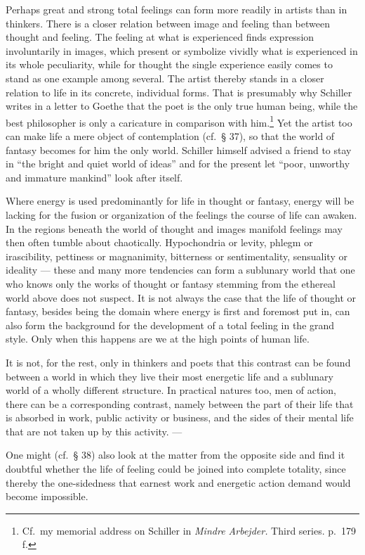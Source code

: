\documentclass[12pt]{book}
\newcommand{\opage}[1]{\marginnote{\footnotesize\textit{[#1]}}}
\begin{document}
Perhaps great and strong total feelings can form more readily in artists than in thinkers. There
is a closer relation between image and feeling than between thought and feeling. The feeling at
what is experienced finds expression involuntarily in images, which present or symbolize vividly
what is experienced in its whole peculiarity, while for thought the single experience easily comes
to stand as one example among several. The artist thereby stands in a closer relation to life in
its concrete, individual forms. That is presumably why Schiller writes in a letter to Goethe that
the poet is the only true human being, while the best philosopher is only a caricature in
\opage{169}comparison with him.\footnote{Cf.\ my memorial address on Schiller in \textit{Mindre
Arbejder.} Third series. p.~179 f.} Yet the artist too can make life a mere object of
contemplation (cf.\ § 37), so that the world of fantasy becomes for him the only world. Schiller
himself advised a friend to stay in ``the bright and quiet world of ideas'' and for the present let
``poor, unworthy and immature mankind'' look after itself.

Where energy is used predominantly for life in thought or fantasy, energy will be lacking for the
fusion or organization of the feelings the course of life can awaken. In the regions beneath the
world of thought and images manifold feelings may then often tumble about chaotically.
Hypochondria or levity, phlegm or irascibility, pettiness or magnanimity, bitterness or
sentimentality, sensuality or ideality --- these and many more tendencies can form a sublunary world
that one who knows only the works of thought or fantasy stemming from the ethereal world above does
not suspect. It is not always the case that the life of thought or fantasy, besides being the domain
where energy is first and foremost put in, can also form the background for the development of a
total feeling in the grand style. Only when this happens are we at the high points of human life.

It is not, for the rest, only in thinkers and poets that this contrast can be found between a world
in which they live their most energetic life and a sublunary world of a wholly different structure.
In practical natures too, men of action, there can be a corresponding contrast, namely between the
part of their life that is absorbed in work, public activity or business, and the sides of their
mental life that are not taken up by this activity. ---

One might (cf.\ § 38) also look at the matter from the opposite side and find it doubtful whether
the life of feeling could be joined into complete totality, since thereby the one-sidedness that
earnest work and energetic action demand would become impossible. %
\end{document}
